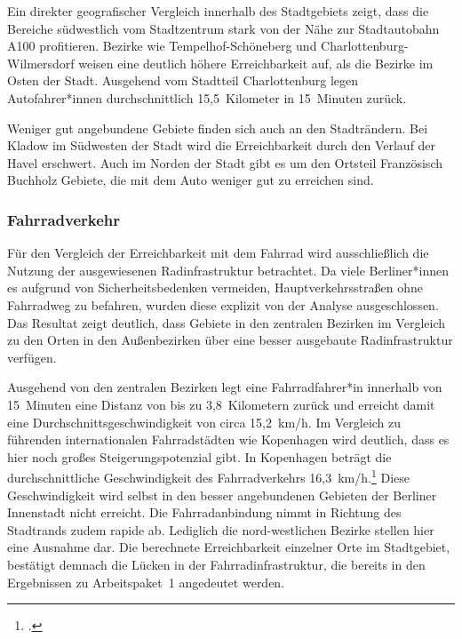 
Ein direkter geografischer Vergleich innerhalb des Stadtgebiets zeigt, dass die Bereiche südwestlich vom Stadtzentrum stark von der Nähe zur Stadtautobahn A100 profitieren. Bezirke wie Tempelhof-Schöneberg und Charlottenburg-Wilmersdorf weisen eine deutlich höhere Erreichbarkeit auf, als die Bezirke im Osten der Stadt. Ausgehend vom Stadtteil Charlottenburg legen Autofahrer*innen durchschnittlich 15,5~Kilometer in 15~Minuten zurück.

Weniger gut angebundene Gebiete finden sich auch an den Stadträndern. Bei Kladow im Südwesten der Stadt wird die Erreichbarkeit durch den Verlauf der Havel erschwert. Auch im Norden der Stadt gibt es um den Ortsteil Französisch Buchholz Gebiete, die mit dem Auto weniger gut zu erreichen sind.

\subsubsection{Fahrradverkehr}

Für den Vergleich der Erreichbarkeit mit dem Fahrrad wird ausschließlich die Nutzung der ausgewiesenen Radinfrastruktur betrachtet. Da viele Berliner*innen es aufgrund von Sicherheitsbedenken vermeiden, Hauptverkehrsstraßen ohne Fahrradweg zu befahren, wurden diese explizit von der Analyse ausgeschlossen. Das Resultat zeigt deutlich, dass Gebiete in den zentralen Bezirken im Vergleich zu den Orten in den Außenbezirken über eine besser ausgebaute Radinfrastruktur verfügen.


Ausgehend von den zentralen Bezirken legt eine Fahrradfahrer*in innerhalb von 15~Minuten eine Distanz von bis zu 3,8~Kilometern zurück und erreicht damit eine Durchschnittsgeschwindigkeit von circa 15,2~km/h. Im Vergleich zu führenden internationalen Fahrradstädten wie Kopenhagen wird deutlich, dass es hier noch großes Steigerungspotenzial gibt. In Kopenhagen beträgt die durchschnittliche Geschwindigkeit des Fahrradverkehrs 16,3~km/h.\footcite{kopenhagen}
Diese Geschwindigkeit wird selbst in den besser angebundenen Gebieten der Berliner Innenstadt nicht erreicht. Die Fahrradanbindung nimmt in Richtung des Stadtrands zudem rapide ab. Lediglich die nord-westlichen Bezirke stellen hier eine Ausnahme dar. Die berechnete Erreichbarkeit einzelner Orte im Stadtgebiet, bestätigt demnach die Lücken in der Fahrradinfrastruktur, die bereits in den Ergebnissen zu Arbeitspaket~1 angedeutet werden.

